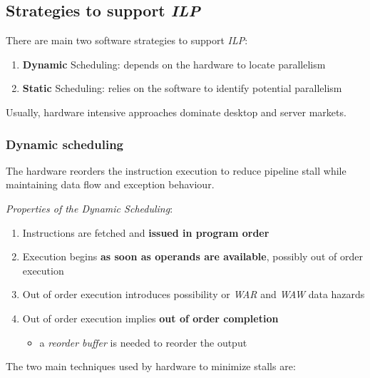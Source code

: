 \documentclass[english]{article}
\begin{document}
\subsection{Strategies to support \textit{ILP}}
\label{sec:strategies-to-support-ilp}

There are main two software strategies to support \textit{ILP}:

\begin{enumerate}
  \item \textbf{Dynamic} Scheduling: depends on the hardware to locate parallelism
  \item \textbf{Static} Scheduling: relies on the software to identify potential parallelism
\end{enumerate}

Usually, hardware intensive approaches dominate desktop and server markets.

\subsubsection{Dynamic scheduling}

The hardware reorders the instruction execution to reduce pipeline stall while maintaining data flow and exception behaviour.

\bigskip
\textit{Properties of the Dynamic Scheduling}:

\begin{enumerate}
  \item Instructions are fetched and \textbf{issued in program order}
  \item Execution begins \textbf{as soon as operands are available}, possibly out of order execution
  \item Out of order execution introduces possibility or \textit{WAR} and \textit{WAW} data hazards
  \item Out of order execution implies \textbf{out of order completion}
        \begin{itemize}[label=\(\rightarrow\)]
          \item a \textit{reorder buffer} is needed to reorder the output
        \end{itemize}
\end{enumerate}

\bigskip
The two main techniques used by hardware to minimize stalls are:
\end{document}
